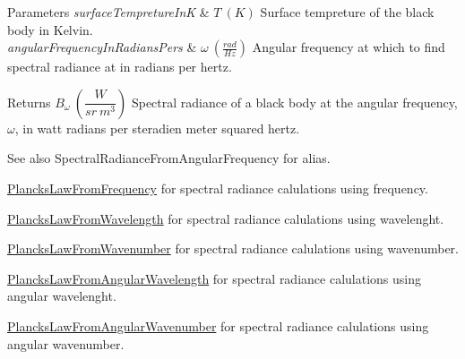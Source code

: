 \begin{DoxyParams}{Parameters}
{\em surface\+Tempreture\+InK} & $T\ (K)$ Surface tempreture of the black body in Kelvin. \\
\hline
{\em angular\+Frequency\+In\+Radians\+Pers} & $\omega\ (\frac{rad}{Hz})$ Angular frequency at which to find spectral radiance at in radians per hertz. \\
\hline
\end{DoxyParams}
\begin{DoxyReturn}{Returns}
$B_{\omega}\ ( \dfrac{W}{sr\ m^3})$ Spectral radiance of a black body at the angular frequency, $\omega$, in watt radians per steradien meter squared hertz. 
\end{DoxyReturn}
\begin{DoxySeeAlso}{See also}
Spectral\+Radiance\+From\+Angular\+Frequency for alias. 

\mbox{\hyperlink{group___e_g_x_phys-_electrodynamics-_black_body-_plancks_law_ga68aae82f8a086831358c4a61c8c80ba4}{Plancks\+Law\+From\+Frequency}} for spectral radiance calulations using frequency. 

\mbox{\hyperlink{group___e_g_x_phys-_electrodynamics-_black_body-_plancks_law_ga54639bc031ded51ef78aa82b0457a4dd}{Plancks\+Law\+From\+Wavelength}} for spectral radiance calulations using wavelenght. 

\mbox{\hyperlink{group___e_g_x_phys-_electrodynamics-_black_body-_plancks_law_ga6648ae2a0fbff6735c1e1a04c7cac746}{Plancks\+Law\+From\+Wavenumber}} for spectral radiance calulations using wavenumber. 

\mbox{\hyperlink{group___e_g_x_phys-_electrodynamics-_black_body-_plancks_law_ga7322124727f968d28807e918c5eeb23f}{Plancks\+Law\+From\+Angular\+Wavelength}} for spectral radiance calulations using angular wavelenght. 

\mbox{\hyperlink{group___e_g_x_phys-_electrodynamics-_black_body-_plancks_law_gaa3d3e0fdb77d25bdd40523f9975de902}{Plancks\+Law\+From\+Angular\+Wavenumber}} for spectral radiance calulations using angular wavenumber. 
\end{DoxySeeAlso}
\mbox{\label{group___e_g_x_phys-_electrodynamics-_black_body-_plancks_law_ga7322124727f968d28807e918c5eeb23f}} 
